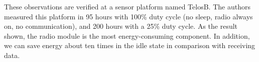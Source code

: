These observations are verified at a sensor platform named TelosB. The authors measured this platform in 95 hours with 100\% duty cycle (no sleep, radio always on, no communication), and 200 hours with a 25\% duty cycle. As the result shown, the radio module is the most energy-consuming component. In addition, we can save energy about ten times in the idle state in comparison with receiving data. 

